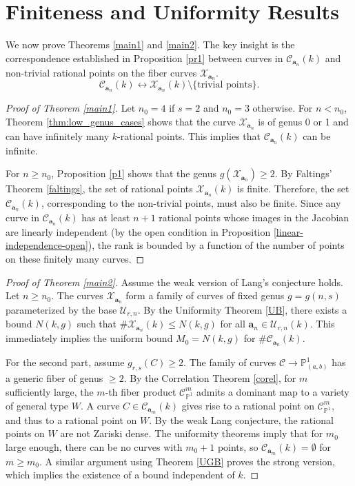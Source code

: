 \documentclass[11pt, a4paper]{amsart}
\theoremstyle{definition}
\newcommand{\Pp}{\mathbb{P}}
\newcommand{\Cc}{\mathcal{C}}
\newcommand{\Uc}{\mathcal{U}}
\newcommand{\Xc}{\mathcal{X}}
\newcommand{\ba}{\mathbf{a}}
\begin{document}
\section{Finiteness and Uniformity Results}
\label{prof-finite}

We now prove Theorems \ref{main1} and \ref{main2}. The key insight is the correspondence established in Proposition \ref{pr1} between curves in $\Cc_{\ba_n}(k)$ and non-trivial rational points on the fiber curves $\Xc_{\ba_n}$.
\[ \Cc_{\ba_n}(k) \longleftrightarrow \Xc_{\ba_n}(k) \setminus \{\text{trivial points}\}. \]

\begin{proof}[Proof of Theorem \ref{main1}]
	Let $n_0 = 4$ if $s=2$ and $n_0=3$ otherwise.
	For $n < n_0$, Theorem \ref{thm:low_genus_cases} shows that the curve $\Xc_{\ba_n}$ is of genus 0 or 1 and can have infinitely many $k$-rational points. This implies that $\Cc_{\ba_n}(k)$ can be infinite.
	
	For $n \geq n_0$, Proposition \ref{p1} shows that the genus $g(\Xc_{\ba_n}) \geq 2$. By Faltings' Theorem \ref{faltings}, the set of rational points $\Xc_{\ba_n}(k)$ is finite. Therefore, the set $\Cc_{\ba_n}(k)$, corresponding to the non-trivial points, must also be finite. Since any curve in $\Cc_{\ba_n}(k)$ has at least $n+1$ rational points whose images in the Jacobian are linearly independent (by the open condition in Proposition \ref{linear-independence-open}), the rank is bounded by a function of the number of points on these finitely many curves.
\end{proof}

\begin{proof}[Proof of Theorem \ref{main2}]
	Assume the weak version of Lang's conjecture holds. Let $n \ge n_0$. The curves $\Xc_{\ba_n}$ form a family of curves of fixed genus $g = g(n,s)$ parameterized by the base $\Uc_{r,n}$. By the Uniformity Theorem \ref{UB}, there exists a bound $N(k,g)$ such that $\#\Xc_{\ba_n}(k) \leq N(k,g)$ for all $\ba_n \in \Uc_{r,n}(k)$. This immediately implies the uniform bound $M_0 = N(k,g)$ for $\#\Cc_{\ba_n}(k)$.
	
	For the second part, assume $g_{r,s}(C) \geq 2$. The family of curves $\Cc \to \Pp^1_{(a,b)}$ has a generic fiber of genus $\geq 2$. By the Correlation Theorem \ref{corel}, for $m$ sufficiently large, the $m$-th fiber product $\Cc^m_{\Pp^1}$ admits a dominant map to a variety of general type $W$. A curve $C \in \Cc_{\ba_m}(k)$ gives rise to a rational point on $\Cc^m_{\Pp^1}$, and thus to a rational point on $W$. By the weak Lang conjecture, the rational points on $W$ are not Zariski dense. The uniformity theorems imply that for $m_0$ large enough, there can be no curves with $m_0+1$ points, so $\Cc_{\ba_m}(k)=\emptyset$ for $m \ge m_0$. A similar argument using Theorem \ref{UGB} proves the strong version, which implies the existence of a bound independent of $k$.
\end{proof}
\end{document}
